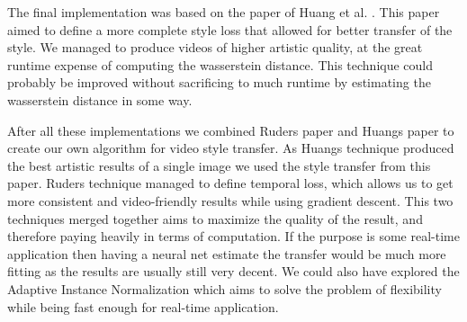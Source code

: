 \medskip

The final implementation was based on the paper of Huang et al. \cite{Huang:1}. This paper aimed to define a more complete style loss that allowed for better transfer of the style. We managed to produce videos of higher artistic quality, at the great runtime expense of computing the wasserstein distance. This technique could probably be improved without sacrificing to much runtime by estimating the wasserstein distance in some way. 

\medskip

After all these implementations we combined Ruders paper \cite{Ruder:1} and Huangs paper \cite{Huang:1} to create our own algorithm for video style transfer. As Huangs technique produced the best artistic results of a single image we used the style transfer from this paper. Ruders technique managed to define temporal loss, which allows us to get more consistent and video-friendly results while using gradient descent. This two techniques merged together aims to maximize the quality of the result, and therefore paying heavily in terms of computation. If the purpose is some real-time application then having a neural net estimate the transfer would be much more fitting as the results are usually still very decent. We could also have explored the Adaptive Instance Normalization \cite{Huang:2} which aims to solve the problem of flexibility while being fast enough for real-time application.